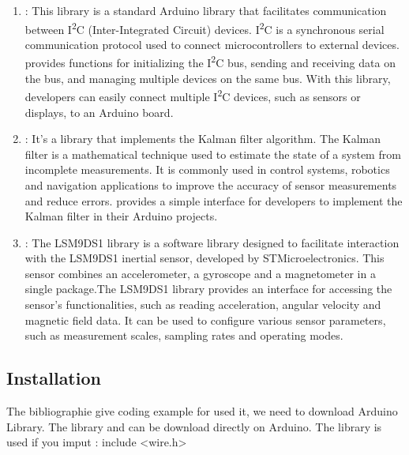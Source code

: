 \begin{enumerate}
	\item {} : 	This library is a standard Arduino library that facilitates communication between I\textsuperscript{2}C (Inter-Integrated Circuit) devices. I\textsuperscript{2}C is a synchronous serial communication protocol used to connect microcontrollers to external devices.  provides functions for initializing the I\textsuperscript{2}C bus, sending and receiving data on the bus, and managing multiple devices on the same bus. With this library, developers can easily connect multiple I\textsuperscript{2}C devices, such as sensors or displays, to an Arduino board. \cite{arduino_wire:2024}
	
	\item {} : It's a library that implements the Kalman filter algorithm. The Kalman filter is a mathematical technique used to estimate the state of a system from incomplete measurements. It is commonly used in control systems, robotics and navigation applications to improve the accuracy of sensor measurements and reduce errors.  provides a simple interface for developers to implement the Kalman filter in their Arduino projects. \cite{arduino_kalman:2024}
	
	\item {} :
	The LSM9DS1 library is a software library designed to facilitate interaction with the LSM9DS1 inertial sensor, developed by STMicroelectronics. This sensor combines an accelerometer, a gyroscope and a magnetometer in a single package.The LSM9DS1 library provides an interface for accessing the sensor's functionalities, such as reading acceleration, angular velocity and magnetic field data. It can be used to configure various sensor parameters, such as measurement scales, sampling rates and operating modes. \cite{arduino_lsm9ds1:2024}
	
	
\end{enumerate}

\subsection{Installation}

The bibliographie give coding example for used it, we need to download Arduino Library.  The library  and  can be download directly on Arduino. The library  is used if you imput :  include <wire.h>

